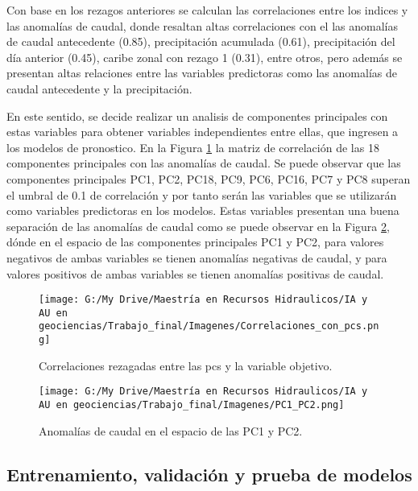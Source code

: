 \documentclass[draft]{agujournal2019}
\begin{document}
Con base en los rezagos anteriores se calculan las correlaciones entre los indices y las anomalías de caudal, donde resaltan altas correlaciones con el las anomalías de caudal antecedente (0.85), precipitación acumulada (0.61), precipitación del día anterior (0.45), caribe zonal con rezago 1 (0.31), entre otros, pero además se presentan altas relaciones entre las variables predictoras como las anomalías de caudal antecedente y la precipitación.  

En este sentido, se decide realizar un analisis de componentes principales con estas variables para obtener variables independientes entre ellas, que ingresen a los modelos de pronostico. En la Figura \ref{fig:corr_pcs} la matriz de correlación de las 18 componentes principales con las anomalías de caudal. Se puede observar que las componentes principales PC1, PC2, PC18, PC9, PC6, PC16, PC7 y PC8 superan el umbral de 0.1 de correlación y por tanto serán las variables que se utilizarán como variables predictoras en los modelos. Estas variables presentan una buena separación de las anomalías de caudal como se puede observar en la Figura \ref{fig:pc1pc2}, dónde en el espacio de las componentes principales PC1 y PC2, para valores negativos de ambas variables se tienen anomalías negativas de caudal, y para valores positivos de ambas variables se tienen anomalías positivas de caudal.

\begin{figure}[!]
	\centering%
	\texttt{[image: G:/My Drive/Maestría en Recursos Hidraulicos/IA y AU en geociencias/Trabajo\_final/Imagenes/Correlaciones\_con\_pcs.png]}
	\caption{Correlaciones rezagadas entre las pcs y la variable objetivo.} \label{fig:corr_pcs}
\end{figure}


\begin{figure}[!]
	\centering%
	\texttt{[image: G:/My Drive/Maestría en Recursos Hidraulicos/IA y AU en geociencias/Trabajo\_final/Imagenes/PC1\_PC2.png]}
	\caption{Anomalías de caudal en el espacio de las PC1 y PC2.} \label{fig:pc1pc2}
\end{figure}


\subsection{Entrenamiento, validación y prueba de modelos}
\end{document}
